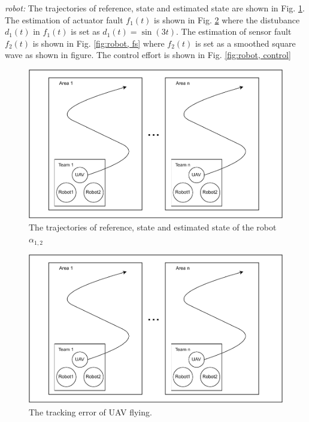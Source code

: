 \documentclass{ieeeaccess}
\begin{document}
\textit{robot:}
The trajectories of reference, state and estimated state are shown in Fig. \ref{fig:robot, state}. The estimation of actuator fault $f_1(t)$ is shown in Fig. \ref{fig:robot, fa} where the distubance $d_1(t)$ in $f_1(t)$ is set as $d_1(t)=\sin(3t)$. The estimation of sensor fault $f_2(t)$ is shown in Fig. \ref{fig:robot, fs} where $f_2(t)$ is set as a smoothed square wave as shown in figure. The control effort is shown in Fig. \ref{fig:robot, control}
\begin{figure}[htbp]
    \centering
    \includegraphics[scale=.42]{fig/1.pdf}\caption{The trajectories of reference, state and estimated state of the robot $\alpha_{1,2}$}%
    \label{fig:robot, state}
\end{figure}
\begin{figure}[htbp]
    \centering
    \includegraphics[scale=.42]{fig/1.pdf}\caption{The tracking error of UAV flying.}%
    \label{fig:robot, fa}
\end{figure}
\end{document}

